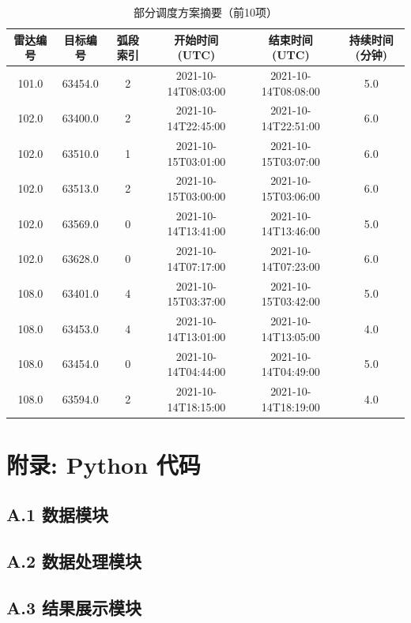 \documentclass[openany,12pt,UTF8]{ctexart}
\begin{document}
\begin{table}
    \centering
    \caption{部分调度方案摘要（前10项）}
    \label{tab:schedule_summary}
    \begin{tabular}{|c|c|c|c|c|c|}
        \hline
        \textbf{雷达编号} & \textbf{目标编号} & \textbf{弧段索引} & \textbf{开始时间 (UTC)} & \textbf{结束时间 (UTC)} & \textbf{持续时间 (分钟)} \\
        \hline
        101.0         & 63454.0       & 2             & 2021-10-14T08:03:00 & 2021-10-14T08:08:00 & 5.0                \\
        \hline
        102.0         & 63400.0       & 2             & 2021-10-14T22:45:00 & 2021-10-14T22:51:00 & 6.0                \\
        \hline
        102.0         & 63510.0       & 1             & 2021-10-15T03:01:00 & 2021-10-15T03:07:00 & 6.0                \\
        \hline
        102.0         & 63513.0       & 2             & 2021-10-15T03:00:00 & 2021-10-15T03:06:00 & 6.0                \\
        \hline
        102.0         & 63569.0       & 0             & 2021-10-14T13:41:00 & 2021-10-14T13:46:00 & 5.0                \\
        \hline
        102.0         & 63628.0       & 0             & 2021-10-14T07:17:00 & 2021-10-14T07:23:00 & 6.0                \\
        \hline
        108.0         & 63401.0       & 4             & 2021-10-15T03:37:00 & 2021-10-15T03:42:00 & 5.0                \\
        \hline
        108.0         & 63453.0       & 4             & 2021-10-14T13:01:00 & 2021-10-14T13:05:00 & 4.0                \\
        \hline
        108.0         & 63454.0       & 0             & 2021-10-14T04:44:00 & 2021-10-14T04:49:00 & 5.0                \\
        \hline
        108.0         & 63594.0       & 2             & 2021-10-14T18:15:00 & 2021-10-14T18:19:00 & 4.0                \\
        \hline
    \end{tabular}
\end{table}

\section*{附录: Python 代码}
\subsection*{A.1 数据模块}


\subsection*{A.2 数据处理模块}


\subsection*{A.3 结果展示模块}

\end{document}
